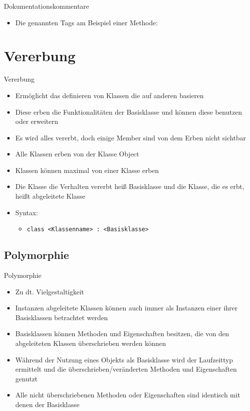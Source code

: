 \begin{frame}{Dokumentationskommentare}
	\begin{itemize}
		\item Die genannten Tags am Beispiel einer Methode:
	\end{itemize}
		
\end{frame}

\section{Vererbung}
\begin{frame}{Vererbung}
	\begin{itemize}
		\item Ermöglicht das definieren von Klassen die auf anderen basieren
		\item Diese erben die Funktionalitäten der Basisklasse und können diese benutzen oder erweitern
		\item Es wird alles vererbt, doch einige Member sind von dem Erben nicht sichtbar 
		\item Alle Klassen erben von der Klasse \alert{Object}
		\item Klassen können maximal von einer Klasse erben
		\item Die Klasse die Verhalten vererbt heiß \alert{Basisklasse} und die Klasse, die es erbt, heißt \alert{abgeleitete Klasse}
		\item Syntax:
		\begin{itemize}
			\item \texttt{class \alert{<Klassenname>} : \alert{<Basisklasse>}} { }
		\end{itemize}
	\end{itemize}
	
\end{frame}

\subsection{Polymorphie}
\begin{frame}{Polymorphie}
	\begin{itemize}
		\item Zu dt. Vielgestaltigkeit
		\item Instanzen abgeleitete Klassen können auch immer als Instanzen einer ihrer Basisklassen betrachtet werden
		\item Basisklassen können Methoden und Eigenschaften besitzen, die von den abgeleiteten Klassen überschrieben werden können
		\item Während der Nutzung eines Objekts als Basisklasse wird der Laufzeittyp ermittelt und die überschrieben/veränderten Methoden und Eigenschaften genutzt
		\item Alle nicht überschriebenen Methoden oder Eigenschaften sind identisch mit denen der Basisklasse
	\end{itemize} 
\end{frame}

